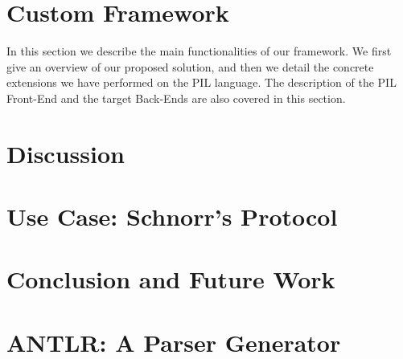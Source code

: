 \documentclass{llncs}
\begin{document}
\section{Custom Framework}
In this section we describe the main functionalities of our framework. We first give
an overview of our proposed solution, and then we detail the concrete extensions 
we have performed on the PIL language. The description of the PIL Front-End and the target 
Back-Ends are also covered in this section.
\label{customframework}



\section{Discussion}
\label{discussion}


\section{Use Case: Schnorr's Protocol}
\label{schnorr}



%

\section{Conclusion and Future Work}
\label{conclusion}






\appendix
\section{ANTLR: A Parser Generator}

\label{sec:antlr}
%
\end{document}
